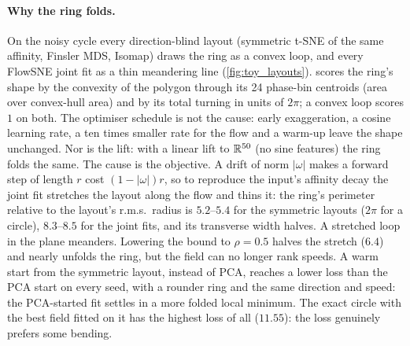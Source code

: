 \paragraph{Why the ring folds.}
\label{app:fold}
On the noisy cycle every direction-blind layout (symmetric t-SNE of the
same affinity, Finsler MDS, Isomap) draws the ring as a convex loop, and
every FlowSNE joint fit as a thin meandering line (\cref{fig:toy_layouts}).
 scores the ring's shape by the convexity of the polygon
through its 24 phase-bin centroids (area over convex-hull area) and by its
total turning in units of $2\pi$; a convex loop scores $1$ on both. The
optimiser schedule is not the cause: early exaggeration, a cosine learning
rate, a ten times smaller rate for the flow and a warm-up leave the shape
unchanged. Nor is the lift: with a linear lift to $\mathbb{R}^{50}$ (no sine
features) the ring folds the same. The cause is the objective. A drift of
norm $|\omega|$ makes a forward step of length $r$ cost $(1-|\omega|)r$,
so to reproduce the input's affinity decay the joint fit stretches the
layout along the flow and thins it: the ring's perimeter relative to the
layout's r.m.s.\ radius is $5.2$--$5.4$ for the symmetric layouts
($2\pi$ for a circle), $8.3$--$8.5$ for the joint fits, and its
transverse width halves. A stretched loop in the plane meanders. Lowering
the bound to $\rho=0.5$ halves the stretch ($6.4$) and nearly unfolds the
ring, but the field can no longer rank speeds. A warm start from the
symmetric layout, instead of PCA, reaches a lower loss than the PCA start
on every seed, with a rounder ring and the same direction and speed: the
PCA-started fit settles in a more folded local minimum. The exact circle
with the best field fitted on it has the highest loss of all
($11.55$): the loss genuinely prefers some bending.


